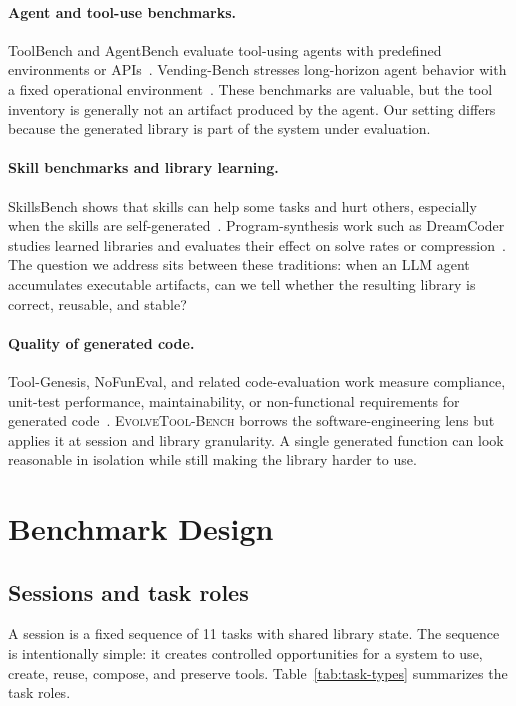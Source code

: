 \documentclass[sigconf,anonymous,review,natbib=false]{acmart}
\begin{document}
\paragraph{Agent and tool-use benchmarks.}
ToolBench and AgentBench evaluate tool-using agents with predefined environments or APIs~\cite{qin2023toolbench,liu2024agentbench}. Vending-Bench stresses long-horizon agent behavior with a fixed operational environment~\cite{backlund2025vendingbench}. These benchmarks are valuable, but the tool inventory is generally not an artifact produced by the agent. Our setting differs because the generated library is part of the system under evaluation.

\paragraph{Skill benchmarks and library learning.}
SkillsBench shows that skills can help some tasks and hurt others, especially when the skills are self-generated~\cite{skillsbench2026}. Program-synthesis work such as DreamCoder studies learned libraries and evaluates their effect on solve rates or compression~\cite{ellis2021dreamcoder}. The question we address sits between these traditions: when an LLM agent accumulates executable artifacts, can we tell whether the resulting library is correct, reusable, and stable?

\paragraph{Quality of generated code.}
Tool-Genesis, NoFunEval, and related code-evaluation work measure compliance, unit-test performance, maintainability, or non-functional requirements for generated code~\cite{xia2026toolgenesis,singhal2024nofuneval}. \textsc{EvolveTool-Bench} borrows the software-engineering lens but applies it at session and library granularity. A single generated function can look reasonable in isolation while still making the library harder to use.

\section{Benchmark Design}

\subsection{Sessions and task roles}

A session is a fixed sequence of 11 tasks with shared library state. The sequence is intentionally simple: it creates controlled opportunities for a system to use, create, reuse, compose, and preserve tools. Table~\ref{tab:task-types} summarizes the task roles.
\end{document}
